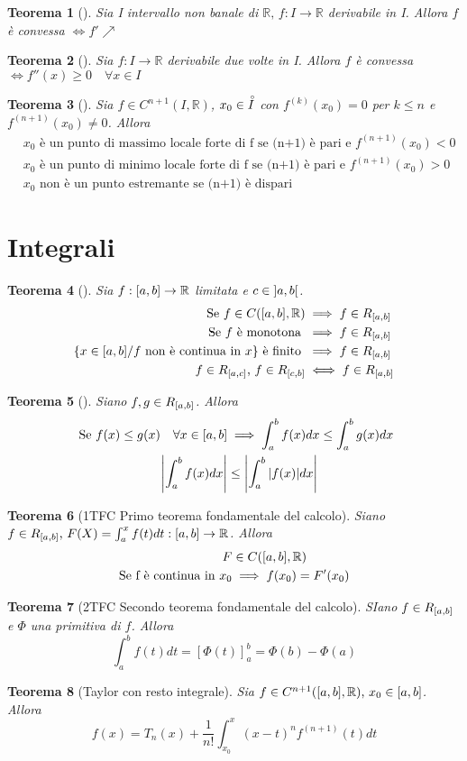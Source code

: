 \documentclass[10pt,a4paper]{article}
\newtheorem{teorema}{Teorema}[section]
\newcommand{\teor}[2][]{\begin{teorema}[#1]#2\end{teorema}}
\newcommand{\R}{\mathbb{R}}
\renewcommand{\,}{\text{, }}
\begin{document}
\teor{
    Sia I intervallo non banale di $\R \, f : I \to \R$ derivabile in I. Allora $f$ è convessa $\iff f' \nearrow$
}
\teor{
    Sia $f : I \to \R$ derivabile due volte in I. Allora $f$ è convessa $\iff f''(x) \ge 0 \quad \forall x \in I$
}
\teor{
    Sia $f \in C^{n+1}(I, \R)$, $x_0 \in \accentset{\circ}{I}$ con $f^{(k)}(x_0) = 0$ per $k \le n$ e $f^{(n+1)}(x_0) \ne 0$. Allora
    \begin{align*}
         & x_0 \text{ è un punto di massimo locale forte di f se (n+1) è pari e } f^{(n+1)}(x_0) < 0 \\
         & x_0 \text{ è un punto di minimo locale forte di f se (n+1) è pari e } f^{(n+1)}(x_0) > 0  \\
         & x_0 \text{ non è un punto estremante se (n+1) è dispari}
    \end{align*}
}
\section{Integrali}
\teor{
    Sia $f : \interval{a}{b} \to \R$ limitata e $c \in \interval[open]{a}{b}$.
    \begin{align*}
        \text{Se } f \in C(\interval{a}{b}, \R)                                         & \implies f \in R_{\interval{a}{b}} \\
        \text{Se } f \text{ è monotona }                                                & \implies f \in R_{\interval{a}{b}} \\
        \{ x \in  \interval{a}{b} / f \text{ non è continua in } x \} \text{ è finito } & \implies f \in R_{\interval{a}{b}} \\
        f \in R_{\interval{a}{c}} \, f \in R_{\interval{c}{b}}                          & \iff f \in R_{\interval{a}{b}}
    \end{align*}
}
\teor{
    Siano $f,g \in R_{\interval{a}{b}}$. Allora
    \begin{align*}
        \text{ Se } f(x) \le g(x) \quad \forall x \in \interval{a}{b} & \implies \int_a^b f(x)dx \le \int_a^b g(x)dx \\
        \left | \int_a^b f(x) dx \right |                             & \le \left | \int_a^b |f(x)| dx \right |
    \end{align*}
}
\teor[1TFC Primo teorema fondamentale del calcolo]{
    Siano $f \in R_{\interval{a}{b}} \, F(X) = \int_a^x f(t) dt : \interval{a}{b} \to \R$. Allora
    \begin{align*}
        F                              & \in C(\interval{a}{b}, \R) \\
        \text{Se f è continua in } x_0 & \implies f(x_0) = F'(x_0)
    \end{align*}
}
\teor[2TFC Secondo teorema fondamentale del calcolo]{
    SIano $f \in R_{\interval{a}{b}}$ e $\Phi$ una primitiva di $f$. Allora
    \[
        \int_a^b f(t) dt = \left [ \Phi(t) \right ]_a^b = \Phi(b) - \Phi(a)
    \]
}
\teor[Taylor con resto integrale]{
    Sia $f \in C^{n+1}(\interval{a}{b}, \R) \, x_0 \in \interval{a}{b}$. Allora
    \[
        f(x) = T_n(x) + \frac{1}{n!} \int_{x_0}^x (x -t)^n f^{(n+1)}(t) dt
    \]
}
\end{document}
